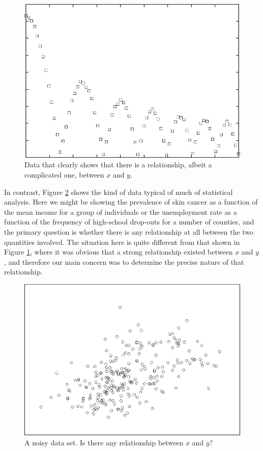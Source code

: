 \begin{figure}
  \centerline{\includegraphics{img/bivariate1}}
  \caption{Data that clearly shows that there is a relationship,
    albeit a complicated one, between $x$ and $y$.}
  \label{fig:bivariate1}\vspace*{-6pt}
\end{figure}\pagebreak

In contrast, Figure \ref{fig:bivariate2} shows the kind of data
typical of much of statistical analysis. Here we might be showing the
prevalence of skin cancer as a function of the mean income for a group
of individuals or the unemployment rate as a function of the frequency
of high-school drop-outs for a number of counties, and the primary
question is whether there is any relationship at all between the two
quantities involved.  The situation here is quite different from that
shown in Figure \ref{fig:bivariate1}, where it was obvious that a
strong relationship existed between $x$ and $y$, and therefore our main
concern was to determine the precise nature of that relationship.

\begin{figure}
  \centerline{\includegraphics{img/bivariate2}}
  \caption{A noisy data set. Is there any relationship between $x$
    and $y$?}
  \label{fig:bivariate2}\vspace*{12pt}
\end{figure}


